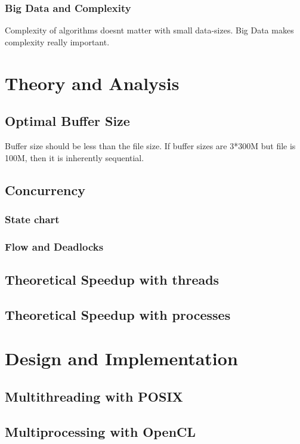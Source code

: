\documentclass[a4paper]{article}
\begin{document}
\subsubsection{Big Data and Complexity}
Complexity of algorithms doesnt matter with small data-sizes. Big Data makes complexity really important.


\section{Theory and Analysis}
\subsection{Optimal Buffer Size}
Buffer size should be less than the file size. If buffer sizes are 3*300M but file is 100M, 
then it is inherently sequential.


\subsection{Concurrency}
\subsubsection{State chart}

\subsubsection{Flow and Deadlocks}

\subsection{Theoretical Speedup with threads}
\subsection{Theoretical Speedup with processes}

\section{Design and Implementation}
\subsection{Multithreading with POSIX}
\subsection{Multiprocessing with OpenCL}
\end{document}
